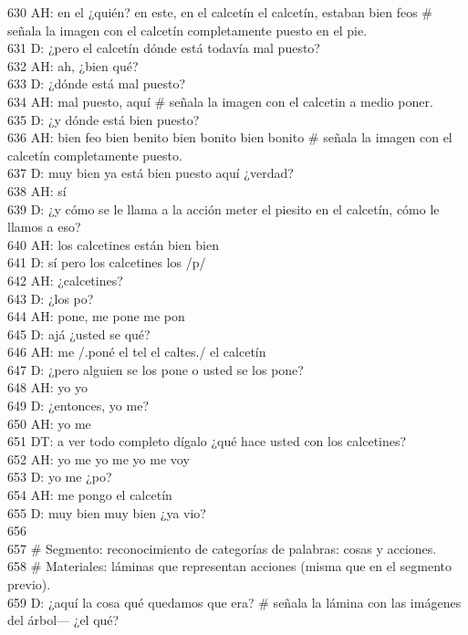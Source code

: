 630 AH: en el ¿quién? en este, en el calcetín el calcetín, estaban bien feos \# señala la imagen con el calcetín completamente puesto en el pie.\\
631 D: ¿pero el calcetín dónde está todavía mal puesto?\\
632 AH: ah, ¿bien qué?\\
633 D: ¿dónde está mal puesto?\\
634 AH: mal puesto, aquí \# señala la imagen con el calcetin a medio poner.\\
635 D: ¿y dónde está bien puesto?\\
636 AH: bien feo bien benito bien bonito bien bonito \# señala la imagen con el calcetín completamente puesto.\\
637 D: muy bien ya está bien puesto aquí ¿verdad?\\
638 AH: sí\\
639 D: ¿y cómo se le llama a la acción meter el piesito en el calcetín, cómo le llamos a eso?\\
640 AH: los calcetines están bien bien\\
641 D: sí pero los calcetines los /p/\\
642 AH: ¿calcetines?\\
643 D: ¿los po?\\
644 AH: pone, me pone me pon\\
645 D: ajá ¿usted se qué?\\
646 AH: me /.poné el tel el caltes./ el calcetín\\
647 D: ¿pero alguien se los pone o usted se los pone?\\
648 AH: yo yo\\
649 D: ¿entonces, yo me?\\
650 AH: yo me\\
651 DT: a ver todo completo dígalo ¿qué hace usted con los calcetines?\\
652 AH: yo me yo me yo me voy\\
653 D: yo me ¿po?\\
654 AH: me pongo el calcetín\\
655 D: muy bien muy bien ¿ya vio?\\
656 \\
657 \# Segmento: reconocimiento de categorías de palabras: cosas y acciones.\\
658 \# Materiales: láminas que representan acciones (misma que en el segmento previo).\\
659 D: ¿aquí la cosa qué quedamos que era? \# señala la lámina con las imágenes del árbol--- ¿el qué?\\
